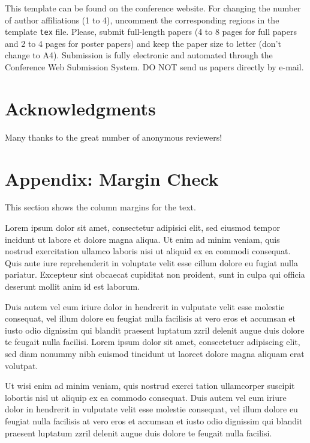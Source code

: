\documentclass[twoside,a4paper]{article}
\begin{document}
This template can be found on the conference website. For changing the number
of author affiliations (1 to 4), uncomment the corresponding regions in the
template \texttt{tex} file. Please, submit full-length papers (4 to 8 pages
for full papers and 2 to 4 pages for poster papers) and keep the paper size to
letter (don't change to A4). Submission is fully electronic and automated 
through the Conference Web Submission System. DO NOT send us papers directly by 
e-mail.

\section{Acknowledgments}

Many thanks to the great number of anonymous reviewers!

\nocite{*}


\section{Appendix: Margin Check}

This section shows the column margins for the text.

Lorem ipsum dolor sit amet, consectetur adipisici elit, sed eiusmod tempor
incidunt ut labore et dolore magna aliqua. Ut enim ad minim veniam, quis
nostrud exercitation ullamco laboris nisi ut aliquid ex ea commodi consequat.
Quis aute iure reprehenderit in voluptate velit esse cillum dolore eu fugiat
nulla pariatur. Excepteur sint obcaecat cupiditat non proident, sunt in culpa
qui officia deserunt mollit anim id est laborum.

Duis autem vel eum iriure dolor in hendrerit in vulputate velit esse molestie
consequat, vel illum dolore eu feugiat nulla facilisis at vero eros et accumsan
et iusto odio dignissim qui blandit praesent luptatum zzril delenit augue duis
dolore te feugait nulla facilisi. Lorem ipsum dolor sit amet, consectetuer
adipiscing elit, sed diam nonummy nibh euismod tincidunt ut laoreet dolore
magna aliquam erat volutpat.

Ut wisi enim ad minim veniam, quis nostrud exerci tation ullamcorper suscipit
lobortis nisl ut aliquip ex ea commodo consequat. Duis autem vel eum iriure
dolor in hendrerit in vulputate velit esse molestie consequat, vel illum dolore
eu feugiat nulla facilisis at vero eros et accumsan et iusto odio dignissim qui
blandit praesent luptatum zzril delenit augue duis dolore te feugait nulla
facilisi.
\end{document}
